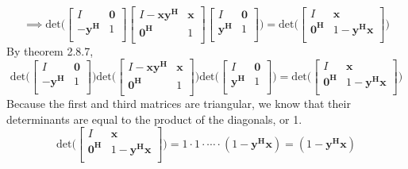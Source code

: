 \documentclass[letterpaper,12pt]{article}
\theoremstyle{definition}
\begin{document}
\[
\implies 
\text{det}\Big(  
\begin{bmatrix}
    I & \mathbf{0} \\
    -\mathbf{y^H} & 1 \\
\end{bmatrix}
\begin{bmatrix}
    I-\mathbf{xy^H} & \mathbf{x} \\
    \mathbf{0^H} & 1 \\
\end{bmatrix}
\begin{bmatrix}
    I & \mathbf{0} \\
    \mathbf{y^H} & 1 \\
\end{bmatrix} \Big)
=\text{det} \Big(
\begin{bmatrix}
    I & \mathbf{x} \\
    \mathbf{0^H} & 1-\mathbf{y^Hx}  \\
\end{bmatrix} \Big)
\]
By theorem 2.8.7, 
\[
\text{det}\Big(  
\begin{bmatrix}
    I & \mathbf{0} \\
    -\mathbf{y^H} & 1 \\
\end{bmatrix}
 \Big) \text{det}  \Big(
\begin{bmatrix}
    I-\mathbf{xy^H} & \mathbf{x} \\
    \mathbf{0^H} & 1 \\
\end{bmatrix}
 \Big) \text{det}  \Big(
\begin{bmatrix}
    I & \mathbf{0} \\
    \mathbf{y^H} & 1 \\
\end{bmatrix} \Big)
=\text{det} \Big(
\begin{bmatrix}
    I & \mathbf{x} \\
    \mathbf{0^H} & 1-\mathbf{y^Hx}  \\
\end{bmatrix} \Big)
\]
Because the first and third matrices are triangular, we know that their determinants are equal to the product of the diagonals, or 1.
\[
\text{det} \Big(
\begin{bmatrix}
    I & \mathbf{x} \\
    \mathbf{0^H} & 1-\mathbf{y^Hx}  \\
\end{bmatrix} \Big)
= 1 \cdot 1 \cdot \cdots \cdot (1- \mathbf{y^Hx}) =(1- \mathbf{y^Hx}  )
\]
\end{document}
